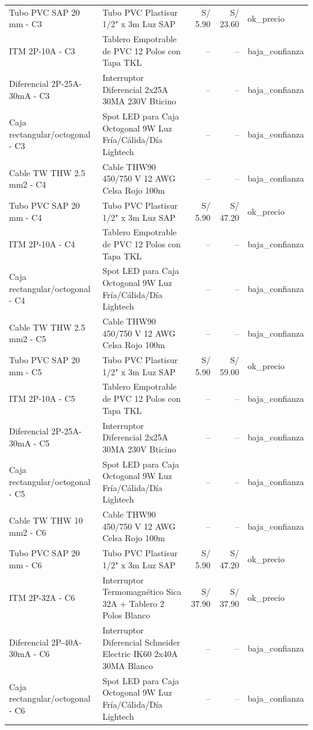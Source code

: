 \documentclass[11pt,a4paper]{article}
\begin{document}
\begin{longtable}{p{} p{} r r p{}}
Tubo PVC SAP 20 mm - C3 & Tubo PVC Plastisur 1/2" x 3m Luz SAP & S/ 5.90 & S/ 23.60 & ok\_precio \\
ITM 2P-10A - C3 & Tablero Empotrable de PVC 12 Polos con Tapa TKL & -- & -- & baja\_confianza \\
Diferencial 2P-25A-30mA - C3 & Interruptor Diferencial 2x25A 30MA 230V Bticino & -- & -- & baja\_confianza \\
Caja rectangular/octogonal - C3 & Spot LED para Caja Octogonal 9W Luz Fría/Cálida/Día Lightech & -- & -- & baja\_confianza \\
Cable TW THW 2.5 mm2 - C4 & Cable THW90 450/750 V 12 AWG Celsa Rojo 100m & -- & -- & baja\_confianza \\
Tubo PVC SAP 20 mm - C4 & Tubo PVC Plastisur 1/2" x 3m Luz SAP & S/ 5.90 & S/ 47.20 & ok\_precio \\
ITM 2P-10A - C4 & Tablero Empotrable de PVC 12 Polos con Tapa TKL & -- & -- & baja\_confianza \\
Caja rectangular/octogonal - C4 & Spot LED para Caja Octogonal 9W Luz Fría/Cálida/Día Lightech & -- & -- & baja\_confianza \\
Cable TW THW 2.5 mm2 - C5 & Cable THW90 450/750 V 12 AWG Celsa Rojo 100m & -- & -- & baja\_confianza \\
Tubo PVC SAP 20 mm - C5 & Tubo PVC Plastisur 1/2" x 3m Luz SAP & S/ 5.90 & S/ 59.00 & ok\_precio \\
ITM 2P-10A - C5 & Tablero Empotrable de PVC 12 Polos con Tapa TKL & -- & -- & baja\_confianza \\
Diferencial 2P-25A-30mA - C5 & Interruptor Diferencial 2x25A 30MA 230V Bticino & -- & -- & baja\_confianza \\
Caja rectangular/octogonal - C5 & Spot LED para Caja Octogonal 9W Luz Fría/Cálida/Día Lightech & -- & -- & baja\_confianza \\
Cable TW THW 10 mm2 - C6 & Cable THW90 450/750 V 12 AWG Celsa Rojo 100m & -- & -- & baja\_confianza \\
Tubo PVC SAP 20 mm - C6 & Tubo PVC Plastisur 1/2" x 3m Luz SAP & S/ 5.90 & S/ 47.20 & ok\_precio \\
ITM 2P-32A - C6 & Interruptor Termomagnético Sica 32A + Tablero 2 Polos Blanco & S/ 37.90 & S/ 37.90 & ok\_precio \\
Diferencial 2P-40A-30mA - C6 & Interruptor Diferencial Schneider Electric IK60 2x40A 30MA Blanco & -- & -- & baja\_confianza \\
Caja rectangular/octogonal - C6 & Spot LED para Caja Octogonal 9W Luz Fría/Cálida/Día Lightech & -- & -- & baja\_confianza \\

\end{longtable}
\end{document}
